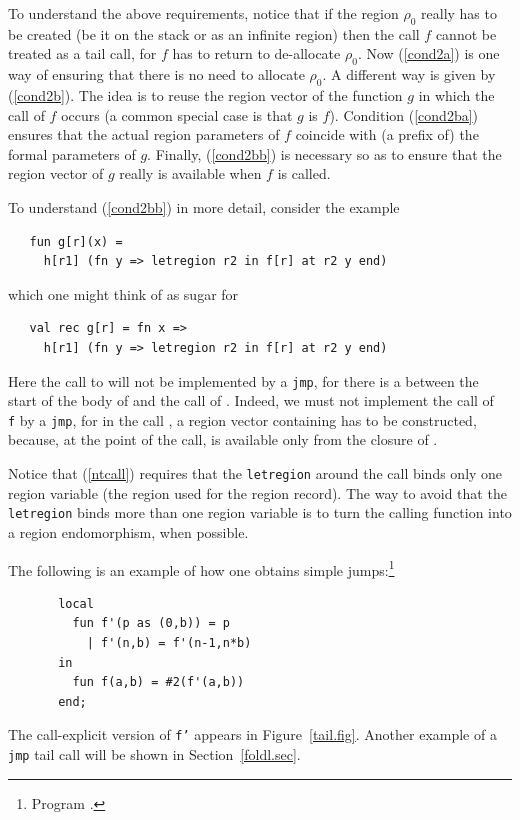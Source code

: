 \documentclass[12pt]{book}
\begin{document}
To understand the above requirements, 
notice that if the region $\rho_0$ really has to be created (be
it on the stack or as an infinite region) then the call $f$ cannot
be treated as a tail call, for $f$ has to return to de-allocate
$\rho_0$. Now (\ref{cond2a}) is one way of ensuring
that there is no need to allocate $\rho_0$. A different way
is given by (\ref{cond2b}). The idea is to reuse the region vector
of the function $g$ in which the call of $f$ occurs (a common special case
is that $g$ is $f$). Condition (\ref{cond2ba}) ensures that the
actual region parameters of $f$ coincide with (a prefix of) the formal
parameters of $g$. Finally, (\ref{cond2bb}) is necessary so as to
ensure that the region vector of $g$ really is available when $f$
is called.

To understand (\ref{cond2bb}) in more detail, consider the example
\begin{verbatim}
   fun g[r](x) = 
     h[r1] (fn y => letregion r2 in f[r] at r2 y end)
\end{verbatim}
which one might think of as sugar for 
\begin{verbatim}
   val rec g[r] = fn x => 
     h[r1] (fn y => letregion r2 in f[r] at r2 y end)
\end{verbatim}
Here the call to  will not be implemented by a {\tt jmp}, for
there is a  between the start of the body of  and
the call of .  Indeed, we must not implement the call of {\tt
f} by a {\tt jmp}, for in the call ,  
a region vector containing  has to be constructed, because,
at the point of the call,  is available only from the closure
of .


Notice that (\ref{ntcall}) requires 
that the {\tt letregion} around the call binds only one region variable (the region used for
the region record). The way to avoid that the {\tt letregion} binds more than one region variable 
is to turn the calling function into a region endomorphism, when possible.

The following is an example of how one obtains simple jumps:\footnote{Program .}
\begin{verbatim}
       local
         fun f'(p as (0,b)) = p
           | f'(n,b) = f'(n-1,n*b)
       in
         fun f(a,b) = #2(f'(a,b))
       end;
\end{verbatim}
The  call-explicit version of {\tt f'} appears in 
Figure~\ref{tail.fig}. 
Another example of a {\tt jmp} tail call 
will be shown in Section~\ref{foldl.sec}.
\end{document}
